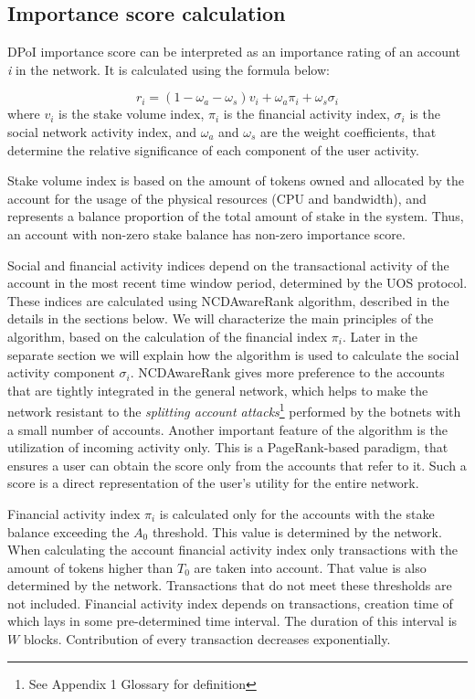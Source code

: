 \documentclass[a4paper,12pt]{article}
\begin{document}
\subsection{Importance score calculation}

DPoI importance score can be interpreted as an importance rating of an account \textit{i} in the network. It is calculated using the formula below: 

\begin{equation}
	    \label{importance_rating}
	    r_i = (1 - \omega_a - \omega_s) v_i + \omega_a \pi_i + \omega_s \sigma_i
	\end{equation}
where $v_i$ is the stake volume index, $\pi_i$ is the financial activity index, $\sigma_i$ is the social network activity index, and $\omega_a$ and $\omega_s$ are the weight coefficients, that determine the relative significance of each component of the user activity. 

Stake volume index is based on the amount of tokens owned and allocated by the account for the usage of the physical resources (CPU and bandwidth), and represents a balance proportion of the total amount of stake in the system. Thus, an account with non-zero stake balance has non-zero importance score. 

Social and financial activity indices depend on the transactional activity of the account in the most recent time window period, determined by the U{\degree}OS protocol. These indices are calculated using NCDAwareRank algorithm, described in the details in the sections below. We will characterize the main principles of the algorithm, based on the calculation of the financial index $\pi_i$. Later in the separate section we will explain how the algorithm is used to calculate the social activity component $\sigma_i$.  NCDAwareRank gives more preference to the accounts that are tightly integrated in the general network, which helps to make the network resistant to the \emph{splitting account attacks}\footnote{See Appendix 1 Glossary for definition} performed by the botnets with a small number of accounts. Another important feature of the algorithm is the utilization of incoming activity only. This is a PageRank-based paradigm, that ensures a user can obtain the score only from the accounts that refer to it. Such a score is a direct representation of the user's utility for the entire network.

Financial activity index $\pi_i$ is calculated only for the accounts with the stake balance exceeding the $A_0$ threshold. This value is determined by the network. When calculating the account financial activity index only transactions with the amount of tokens higher than $T_0$ are taken into account. That value is also determined by the network. Transactions that do not meet these thresholds are not included. Financial activity index depends on transactions, creation time of which lays in some pre-determined time interval. The duration of this interval is $W$ blocks. Contribution of every transaction decreases exponentially.
\end{document}
